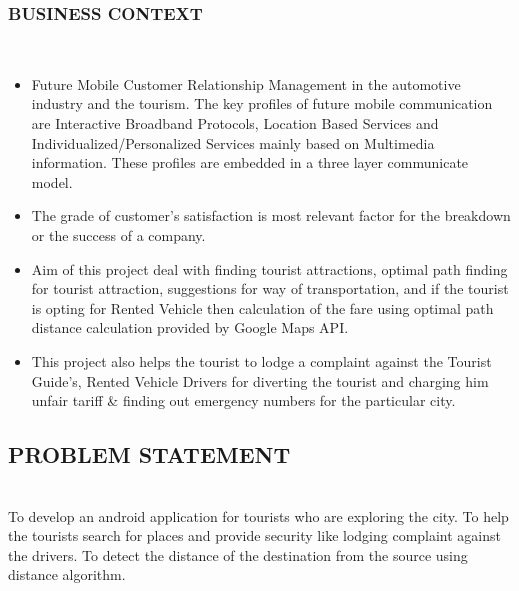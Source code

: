 \documentclass[12pt,a4paper]{article}
\begin{document}
\subsubsection{BUSINESS CONTEXT}
\\
\begin{itemize}
\item Future Mobile Customer Relationship Management in the automotive industry and the tourism. The key profiles of future mobile communication are Interactive Broadband Protocols, Location Based Services and Individualized/Personalized Services mainly based on Multimedia information. These profiles are embedded in a three layer communicate model.
\\
\item The grade of customer’s satisfaction is most relevant factor for the breakdown or the success of a company. 
\\
\item Aim of this project deal with finding tourist attractions, optimal path finding for tourist attraction, suggestions for way of transportation, and if the tourist is opting for Rented Vehicle then calculation of the fare using optimal path distance calculation provided by Google Maps API.
\\
\item This project also helps the tourist to lodge a complaint against the Tourist Guide’s, Rented Vehicle Drivers for diverting the tourist and charging him unfair tariff & finding out emergency numbers for the particular city.
\end{itemize}

\newpage
\subsection{PROBLEM STATEMENT}
\\
\hspace{0.7 cm}To develop an android application for tourists who are exploring the city. To help the tourists search for places and provide security like lodging complaint against the drivers. To detect the distance of the destination from the source using distance algorithm.
\end{document}
